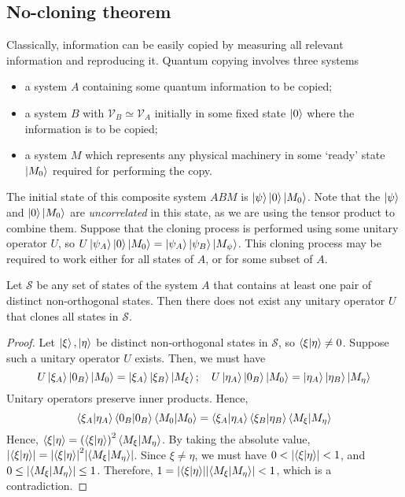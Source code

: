 \subsection{No-cloning theorem}
Classically, information can be easily copied by measuring all relevant information and reproducing it.
Quantum copying involves three systems
\begin{itemize}
    \item a system \( A \) containing some quantum information to be copied;
    \item a system \( B \) with \( \mathcal V_B \simeq \mathcal V_A \) initially in some fixed state \( \ket{0} \) where the information is to be copied;
    \item a system \( M \) which represents any physical machinery in some `ready' state \( \ket{M_0} \) required for performing the copy.
\end{itemize}
The initial state of this composite system \( ABM \) is \( \ket{\psi} \ket{0} \ket{M_0} \).
Note that the \( \ket{\psi} \) and \( \ket{0}\ket{M_0} \) are \emph{uncorrelated} in this state, as we are using the tensor product to combine them.
Suppose that the cloning process is performed using some unitary operator \( U \), so \( U\ket{\psi_A}\ket{0}\ket{M_0} = \ket{\psi_A}\ket{\psi_B}\ket{M_\psi} \).
This cloning process may be required to work either for all states of \( A \), or for some subset of \( A \).
\begin{theorem}
    Let \( \mathcal S \) be any set of states of the system \( A \) that contains at least one pair of distinct non-orthogonal states.
    Then there does not exist any unitary operator \( U \) that clones all states in \( \mathcal S \).
\end{theorem}
\begin{proof}
    Let \( \ket{\xi}, \ket{\eta} \) be distinct non-orthogonal states in \( \mathcal S \), so \( \ip{\xi}{\eta} \neq 0 \).
    Suppose such a unitary operator \( U \) exists.
    Then, we must have
    \[ U \ket{\xi_A}\ket{0_B}\ket{M_0} = \ket{\xi_A}\ket{\xi_B}\ket{M_\xi};\quad U \ket{\eta_A}\ket{0_B}\ket{M_0} = \ket{\eta_A}\ket{\eta_B}\ket{M_\eta} \]
    Unitary operators preserve inner products.
    Hence,
    \[ \ip{\xi_A}{\eta_A} \ip{0_B}{0_B} \ip{M_0}{M_0} = \ip{\xi_A}{\eta_A} \ip{\xi_B}{\eta_B} \ip{M_\xi}{M_\eta} \]
    Hence, \( \ip{\xi}{\eta} = \qty(\ip{\xi}{\eta})^2 \ip{M_\xi}{M_\eta} \).
    By taking the absolute value, \( \abs{\ip{\xi}{\eta}} = \abs{\ip{\xi}{\eta}}^2 \abs{\ip{M_\xi}{M_\eta}} \).
    Since \( \xi \neq \eta \), we must have \( 0 < \abs{\ip{\xi}{\eta}} < 1 \), and \( 0 \leq \abs{\ip{M_\xi}{M_\eta}} \leq 1 \).
    Therefore, \( 1 = \abs{\ip{\xi}{\eta}} \abs{\ip{M_\xi}{M_\eta}} < 1 \), which is a contradiction.
\end{proof}
